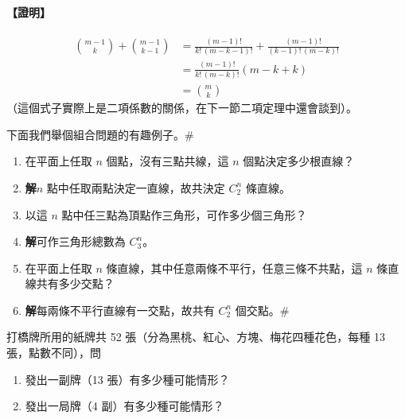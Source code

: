 \paragraph{【證明】}
\begin{align*}
\binom{m-1}{k} + \binom{m-1}{k-1} &= \frac{(m-1)!}{k!\, (m-k-1)!} + \frac{(m-1)!}{(k-1)!\, (m-k)!} \\
&= \frac{(m-1)!}{k!\, (m-k)!} (m - k + k) \\
&= \binom{m}{k}
\end{align*}
（這個式子實際上是二項係數的關係，在下一節二項定理中還會談到）。

下面我們舉個組合問題的有趣例子。\hfill $\#$

\medskip
\begin{example}\label{ex:b5s-2-14}
\begin{enumerate}[label=(\roman*), topsep=2pt, itemsep=4pt]
  \item 在平面上任取 $n$ 個點，沒有三點共線，這 $n$ 個點決定多少根直線？
  \item[] \textbf{解}\quad $n$ 點中任取兩點決定一直線，故共決定 $C_2^n$ 條直線。
  \item 以這 $n$ 點中任三點為頂點作三角形，可作多少個三角形？
  \item[] \textbf{解}\quad 可作三角形總數為 $C_3^n$。
  \item 在平面上任取 $n$ 條直線，其中任意兩條不平行，任意三條不共點，這 $n$ 條直線共有多少交點？
  \item[] \textbf{解}\quad 每兩條不平行直線有一交點，故共有 $C_2^n$ 個交點。\hfill $\#$
\end{enumerate}
\end{example}

\medskip
\begin{example}\label{ex:b5s-2-15}
打橋牌所用的紙牌共 52 張（分為黑桃、紅心、方塊、梅花四種花色，每種 13 張，點數不同），問
\begin{enumerate}[label=(\roman*), topsep=2pt, itemsep=4pt]
  \item 發出一副牌（13 張）有多少種可能情形？
  \item 發出一局牌（4 副）有多少種可能情形？
\end{enumerate}
\end{example}
